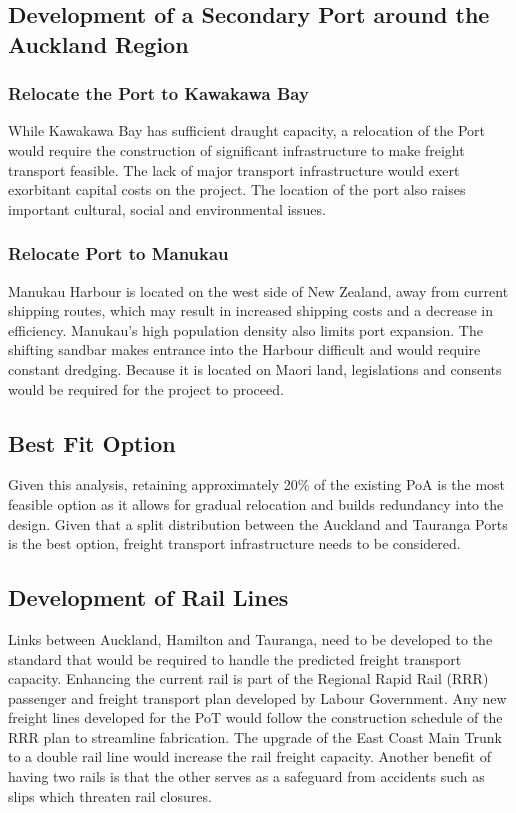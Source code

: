 \subsection*{Development of a Secondary Port around the Auckland Region}
\subsubsection*{Relocate the Port to Kawakawa Bay}
While Kawakawa Bay has sufficient draught capacity, a relocation of the Port would require the construction of significant infrastructure to make freight transport feasible. The lack of major transport infrastructure would exert exorbitant capital costs on the project. The location of the port also raises important cultural, social and environmental issues.
\subsubsection*{Relocate Port to Manukau}
Manukau Harbour is located on the west side of New Zealand, away from current shipping routes, which may result in increased shipping costs and a decrease in efficiency. Manukau’s high population density also limits port expansion. The shifting sandbar makes entrance into the Harbour difficult and would require constant dredging. Because it is located on Maori land, legislations and consents would be required for the project to proceed. 
\subsection*{Best Fit Option}
Given this analysis, retaining approximately 20\% of the existing PoA is the most feasible option as it allows for gradual relocation and builds redundancy into the design. Given that a split distribution between the Auckland and Tauranga Ports is the best option, freight transport infrastructure needs to be considered.
\subsection*{Development of Rail Lines}
Links between Auckland, Hamilton and Tauranga, need to be developed to the standard that would be required to handle the predicted freight transport capacity. Enhancing the current rail is part of the Regional Rapid Rail (RRR) passenger and freight transport plan developed by Labour Government. Any new freight lines developed for the PoT would follow the construction schedule of the RRR plan to streamline fabrication. The upgrade of the East Coast Main Trunk to a double rail line would increase the rail freight capacity. Another benefit of having two rails is that the other serves as a safeguard from accidents such as slips which threaten rail closures. 
